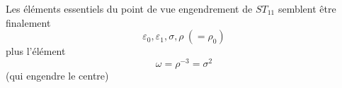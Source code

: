 Les éléments essentiels du point de vue engendrement de $ST_{11}$  semblent être finalement
\[
\varepsilon_0,\varepsilon_1,\sigma,\rho\ (=\rho_0)
\]
plus l'élément
\[\omega=\rho^{-3}=\sigma^2\]
(qui engendre le centre)
